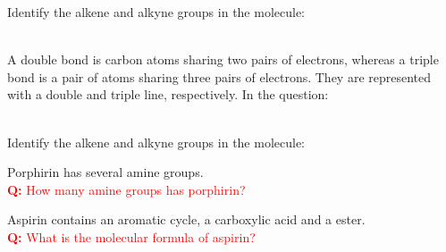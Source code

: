 \documentclass[main.tex]{subfiles}
\begin{document}
\begin{description}
\begin{example} %
Identify the alkene and alkyne groups in the molecule:
\begin{center}\end{center}
\\
A double bond is carbon atoms sharing two pairs of electrons, whereas a triple bond is a pair of atoms sharing three pairs of electrons. They are represented with a double and triple line, respectively. In the question:
\begin{center}\end{center}

\faDiamond\ \\
Identify the alkene and alkyne groups in the molecule:
\begin{center}\end{center}
\end{example}%

\begin{marginfigure}[-5cm]%
\begin{center}
\end{center}
\caption{Porphirin has several amine groups. \\ \textcolor{red}{\textbf{Q:} How many amine groups has porphirin?} }
\end{marginfigure}%
\begin{marginfigure}[0cm]%
\begin{center}
\end{center}
\caption{Aspirin contains an aromatic cycle, a carboxylic acid and a ester. \\ \textcolor{red}{\textbf{Q:} What is the molecular formula of aspirin?} }
\end{marginfigure}%


\end{description}
\end{document}
